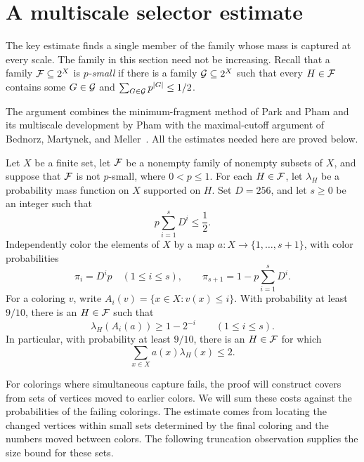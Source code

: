 \section{A multiscale selector estimate}
\label{sec:selector}

The key estimate finds a single member of the family whose mass is
captured at every scale.  The family in this section need not be
increasing.  Recall that a family $\mathcal F\subseteq 2^X$ is
\emph{$p$-small} if there is a family $\mathcal G\subseteq 2^X$ such that every
$H\in\mathcal F$ contains some $G\in\mathcal G$ and
$\sum_{G\in\mathcal G}p^{|G|}\le 1/2$.

The argument combines the minimum-fragment method of Park and Pham
\cite[Definitions~2.3 and~2.5, Proposition~2.6]{ParkPham2024selector}
and its multiscale development by Pham
\cite[arXiv version~1, Section~2]{Pham2024} with the maximal-cutoff
argument of Bednorz, Martynek, and Meller~\cite[Lemma~3.6]{BMM2022}.
All the estimates needed here are proved below.

\begin{theorem}
\label{thm:multiscale-selector}
Let $X$ be a finite set, let $\mathcal F$ be a nonempty family of nonempty
subsets of $X$, and suppose that $\mathcal F$ is not $p$-small, where
$0<p\le 1$.  For each $H\in\mathcal F$, let $\lambda_H$ be a probability mass
function on $X$ supported on $H$.  Set $D=256$, and let $s\ge 0$ be an
integer such that
\[
  p\sum_{i=1}^s D^i\le \frac12.
\]
Independently color the elements of $X$ by a map
$a:X\to\{1,\ldots,s+1\}$, with color probabilities
\begin{equation}
\label{sel:color-probabilities}
  \pi_i=D^ip\quad(1\le i\le s),
  \qquad
  \pi_{s+1}=1-p\sum_{i=1}^sD^i.
\end{equation}
For a coloring $v$, write $A_i(v)=\{x\in X:v(x)\le i\}$.
With probability at least $9/10$, there is an $H\in\mathcal F$ such that
\begin{equation}
\label{sel:simultaneous-capture}
  \lambda_H(A_i(a))\ge 1-2^{-i}
  \qquad(1\le i\le s).
\end{equation}
In particular, with probability at least $9/10$, there is an
$H\in\mathcal F$ for which
\begin{equation}
\label{sel:average-color}
  \sum_{x\in X}a(x)\lambda_H(x)\le 2.
\end{equation}
\end{theorem}

For colorings where simultaneous capture fails, the proof will construct
covers from sets of vertices moved to earlier colors. We will sum these
costs against the probabilities of the failing colorings. The estimate
comes from locating the changed vertices within small sets determined
by the final coloring and the numbers moved between colors. The
following truncation observation supplies the size bound for these sets.

